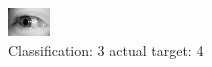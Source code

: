 \begin{figure}[h!]
\begin{center}
\includegraphics[width=0.60\columnwidth]{figures/ID3126_class_3_target_4.png}
\end{center}
\caption{ Classification: 3 actual target: 4}
\label{fig:ID3126_class_3_target_4}
\end{figure}
